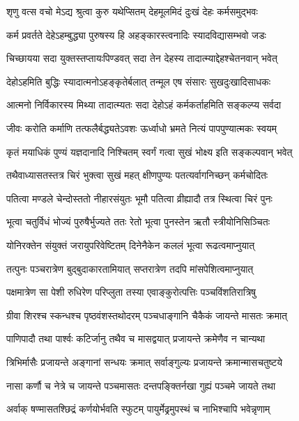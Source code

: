 \twolineshloka
{शृणु वत्स वचो मेऽद्य श्रुत्वा कुरु यथेप्सितम्}
{देहमूलमिदं दुःखं देहः कर्मसमुद्भवः} %

\twolineshloka
{कर्म प्रवर्तते देहेऽहम्बुद्ध्या पुरुषस्य हि}
{अहङ्कारस्त्वनादिः स्यादविद्यासम्भवो जडः} %

\twolineshloka
{चिच्छायया सदा युक्तस्तप्तायःपिण्डवत् सदा}
{तेन देहस्य तादात्म्याद्देहश्चेतनवान् भवेत्} %

\twolineshloka
{देहोऽहमिति बुद्धिः स्यादात्मनोऽहङ्कृतेर्बलात्}
{तन्मूल एष संसारः सुखदुःखादिसाधकः} %

\twolineshloka
{आत्मनो निर्विकारस्य मिथ्या तादात्म्यतः सदा}
{देहोऽहं कर्मकर्ताहमिति सङ्कल्प्य सर्वदा} %

\twolineshloka
{जीवः करोति कर्माणि तत्फलैर्बद्ध्यतेऽवशः}
{ऊर्ध्वाधो भ्रमते नित्यं पापपुण्यात्मकः स्वयम्} %

\twolineshloka
{कृतं मयाधिकं पुण्यं यज्ञदानादि निश्चितम्}
{स्वर्गं गत्वा सुखं भोक्ष्य इति सङ्कल्पवान् भवेत्} %

\twolineshloka
{तथैवाध्यासतस्तत्र चिरं भुक्त्वा सुखं महत्}
{क्षीणपुण्यः पतत्यर्वागनिच्छन् कर्मचोदितः} %

\twolineshloka
{पतित्वा मण्डले चेन्दोस्ततो नीहारसंयुतः}
{भूमौ पतित्वा व्रीह्यादौ तत्र स्थित्वा चिरं पुनः} %

\twolineshloka
{भूत्वा चतुर्विधं भोज्यं पुरुषैर्भुज्यते ततः}
{रेतो भूत्वा पुनस्तेन ऋतौ स्त्रीयोनिसिञ्चितः} %

\twolineshloka
{योनिरक्तेन संयुक्तं जरायुपरिवेष्टितम्}
{दिनेनैकेन कललं भूत्वा रूढत्वमाप्नुयात्} %

\twolineshloka
{तत्पुनः पञ्चरात्रेण बुद्बुदाकारतामियात्}
{सप्तरात्रेण तदपि मांसपेशित्वमाप्नुयात्} %

\twolineshloka
{पक्षमात्रेण सा पेशी रुधिरेण परिप्लुता}
{तस्या एवाङ्कुरोत्पत्तिः पञ्चविंशतिरात्रिषु} %

\twolineshloka
{ग्रीवा शिरश्च स्कन्धश्च पृष्ठवंशस्तथोदरम्}
{पञ्चधाङ्गानि चैकैकं जायन्ते मासतः क्रमात्} %

\twolineshloka
{पाणिपादौ तथा पार्श्वः कटिर्जानु तथैव च}
{मासद्वयात् प्रजायन्ते क्रमेणैव न चान्यथा} %

\twolineshloka
{त्रिभिर्मासैः प्रजायन्ते अङ्गानां सन्धयः क्रमात्}
{सर्वाङ्गुल्यः प्रजायन्ते क्रमान्मासचतुष्टये} %

\twolineshloka
{नासा कर्णौ च नेत्रे च जायन्ते पञ्चमासतः}
{दन्तपङ्क्तिर्नखा गुह्यं पञ्चमे जायते तथा} %

\twolineshloka
{अर्वाक् षण्मासतश्छिद्रं कर्णयोर्भवति स्फुटम्}
{पायुर्मेढ्रमुपस्थं च नाभिश्चापि भवेन्नृणाम्} %

